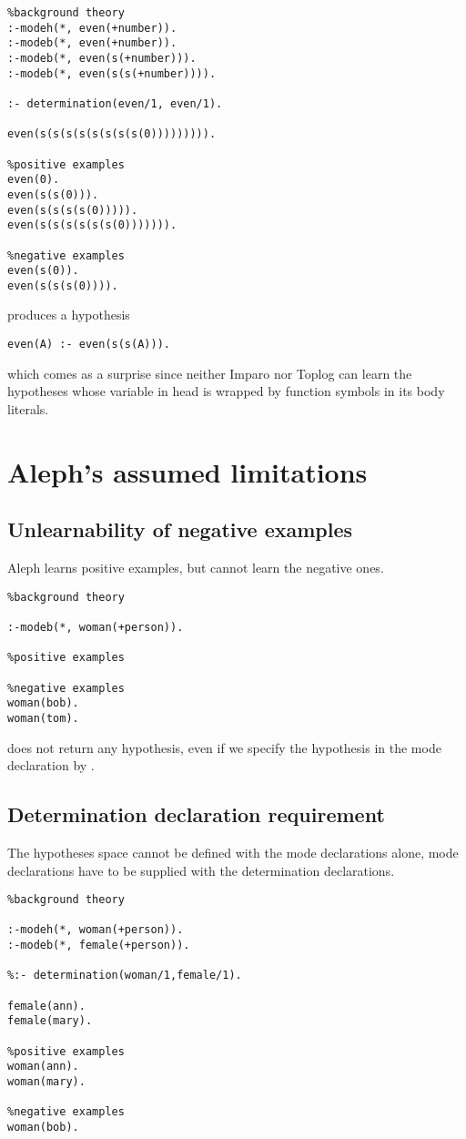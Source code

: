 \begin{lstlisting}
%background theory
:-modeh(*, even(+number)).
:-modeb(*, even(+number)).
:-modeb(*, even(s(+number))).
:-modeb(*, even(s(s(+number)))).

:- determination(even/1, even/1).

even(s(s(s(s(s(s(s(s(0))))))))).

%positive examples
even(0).
even(s(s(0))).
even(s(s(s(s(0))))).
even(s(s(s(s(s(s(0))))))).

%negative examples
even(s(0)).
even(s(s(s(0)))).
\end{lstlisting}
produces a hypothesis
\begin{lstlisting}
even(A) :- even(s(s(A))).
\end{lstlisting}
which comes as a surprise since neither Imparo nor Toplog can learn the hypotheses whose variable in head is wrapped by function symbols in its body literals.

\section{Aleph's assumed limitations}
\subsection{Unlearnability of negative examples}
Aleph learns positive examples, but cannot learn the negative ones.
\begin{lstlisting}
%background theory

:-modeb(*, woman(+person)).

%positive examples

%negative examples
woman(bob).
woman(tom).
\end{lstlisting}
does not return any hypothesis, even if we specify the hypothesis in the mode declaration by .

\subsection{Determination declaration requirement}
The hypotheses space cannot be defined with the mode declarations alone, mode declarations have to be supplied with the determination declarations.
\begin{lstlisting}
%background theory

:-modeh(*, woman(+person)).
:-modeb(*, female(+person)).

%:- determination(woman/1,female/1).

female(ann).
female(mary).

%positive examples
woman(ann).
woman(mary).

%negative examples
woman(bob).
\end{lstlisting}

